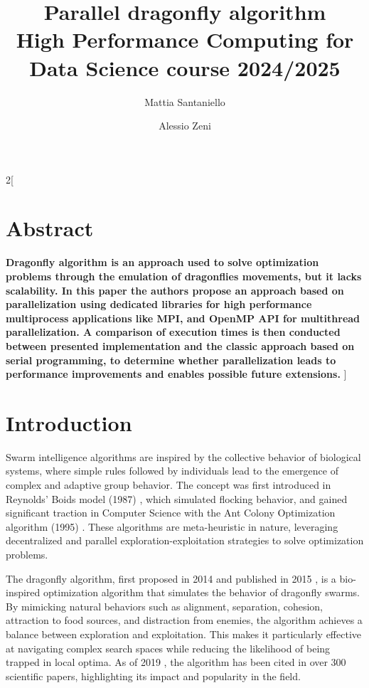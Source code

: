 \documentclass[10pt]{article}
\title{\textbf{Parallel dragonfly algorithm} %
  \\[2ex] \large High Performance Computing for Data Science course 2024/2025}
\author[1]{Mattia Santaniello}
\author[2]{Alessio Zeni}
\affil{University of Trento}
\begin{document}
\maketitle

\begin{multicols}{2}[
  \fontsize{9}{9}
  \section*{Abstract}
  \textbf{
    Dragonfly algorithm is an approach used to solve optimization problems through the emulation of dragonflies movements, but it lacks scalability.
  In this paper the authors propose an approach based on parallelization using dedicated libraries for high performance multiprocess applications like MPI, and OpenMP API for multithread parallelization.
  A comparison of execution times is then conducted between presented implementation and the classic approach based on serial programming,
  to determine whether parallelization leads to performance improvements and enables possible future extensions.
  }\newline]

\section{Introduction}
Swarm intelligence algorithms are inspired by the collective behavior of biological systems, where simple rules followed by individuals lead to the emergence of complex and adaptive group behavior.
The concept was first introduced in Reynolds' Boids model (1987) \cite{Boids}, which simulated flocking behavior, and gained significant traction in Computer Science with the Ant Colony Optimization algorithm (1995) \cite{Ant_Colony_optimization}.
These algorithms are meta-heuristic in nature, leveraging decentralized and parallel exploration-exploitation strategies to solve optimization problems.

The dragonfly algorithm, first proposed in 2014 and published in 2015 \cite{Original}, is a bio-inspired optimization algorithm that simulates the behavior of dragonfly swarms.
By mimicking natural behaviors such as alignment, separation, cohesion, attraction to food sources, and distraction from enemies, the algorithm achieves a balance between exploration and exploitation.
This makes it particularly effective at navigating complex search spaces while reducing the likelihood of being trapped in local optima.
As of 2019 \cite{Meraihi2020}, the algorithm has been cited in over 300 scientific papers, highlighting its impact and popularity in the field.


\end{multicols}
\end{document}
